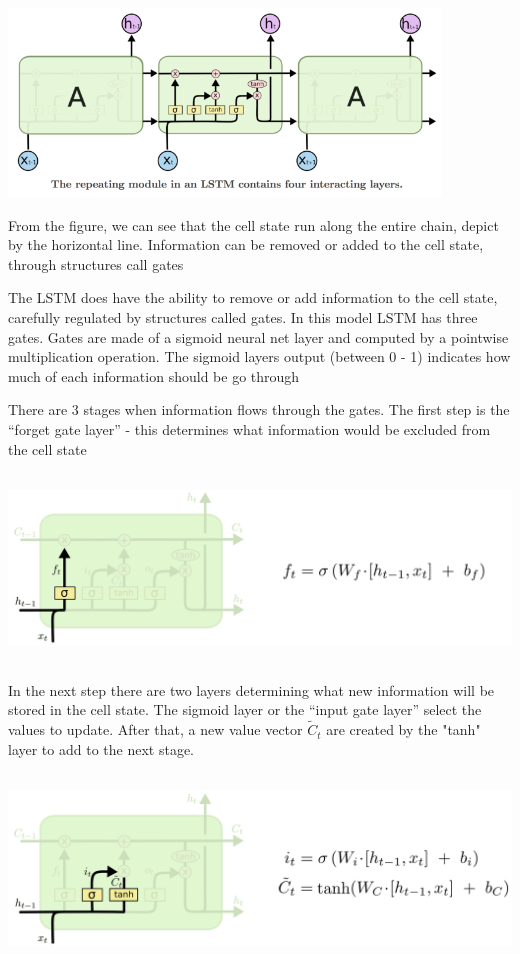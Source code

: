 \documentclass[a4paper,11pt]{article}
\begin{document}
\includegraphics[height = 5cm]{figure2.png}

From the figure, we can see that the cell state run along the entire chain, depict by the horizontal line. Information can be removed or added to the cell state, through structures call gates

The LSTM does have the ability to remove or add information to the cell state, carefully regulated by structures called gates. In this model LSTM has three gates. Gates are made of a sigmoid neural net layer and computed by a pointwise multiplication operation. The sigmoid layers output (between 0 - 1) indicates how much of each information should be go through

There are 3 stages when information flows through the gates. The first step is the “forget gate layer” - this determines what information would be excluded from the cell state

\includegraphics[height = 5cm]{ltsm1.png}

In the next step there are two layers determining what new information will be stored in the cell state. The sigmoid layer or the “input gate layer” select the values to update. After that, a new value vector $\tilde{C}_t$ are created by the "tanh" layer to add to the next stage. 

\includegraphics[height = 5cm]{ltsm2.png}
\end{document}
